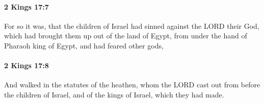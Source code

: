 		\paragraph{2 Kings 17:7} %
			\label{2KINGS-17-7}

			For so it was, that the children of Israel had sinned against the LORD their God, which had brought them up out of the land of Egypt, from under the hand of Pharaoh king of Egypt, and had feared other gods,


		\paragraph{2 Kings 17:8} %
			\label{2KINGS-17-8}

			And walked in the statutes of the heathen, whom the LORD cast out from before the children of Israel, and of the kings of Israel, which they had made.


